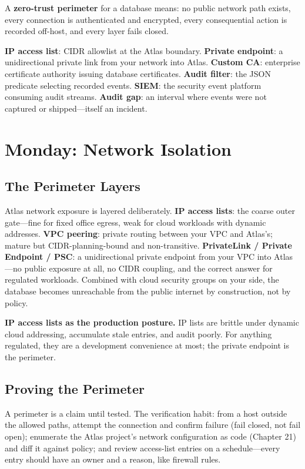 \begin{definitionbox}
A \textbf{zero-trust perimeter} for a database means: no public network path exists, every connection is authenticated and encrypted, every consequential action is recorded off-host, and every layer fails closed.
\end{definitionbox}

\begin{keyterms}
\textbf{IP access list}: CIDR allowlist at the Atlas boundary. \textbf{Private endpoint}: a unidirectional private link from your network into Atlas. \textbf{Custom CA}: enterprise certificate authority issuing database certificates. \textbf{Audit filter}: the JSON predicate selecting recorded events. \textbf{SIEM}: the security event platform consuming audit streams. \textbf{Audit gap}: an interval where events were not captured or shipped---itself an incident.
\end{keyterms}

\section{Monday: Network Isolation}
\subsection{The Perimeter Layers}
Atlas network exposure is layered deliberately. \textbf{IP access lists}: the coarse outer gate---fine for fixed office egress, weak for cloud workloads with dynamic addresses. \textbf{VPC peering}: private routing between your VPC and Atlas's; mature but CIDR-planning-bound and non-transitive. \textbf{PrivateLink / Private Endpoint / PSC}: a unidirectional private endpoint from your VPC into Atlas---no public exposure at all, no CIDR coupling, and the correct answer for regulated workloads. Combined with cloud security groups on your side, the database becomes unreachable from the public internet by construction, not by policy.

\begin{pitfall}
\textbf{IP access lists as the production posture.} IP lists are brittle under dynamic cloud addressing, accumulate stale entries, and audit poorly. For anything regulated, they are a development convenience at most; the private endpoint is the perimeter.
\end{pitfall}

\subsection{Proving the Perimeter}
A perimeter is a claim until tested. The verification habit: from a host outside the allowed paths, attempt the connection and confirm failure (fail closed, not fail open); enumerate the Atlas project's network configuration as code (Chapter 21) and diff it against policy; and review access-list entries on a schedule---every entry should have an owner and a reason, like firewall rules.

